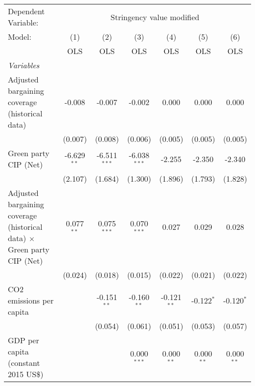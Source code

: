 
\begingroup
\centering
\begin{tabular}{lcccccc}
   \toprule
   Dependent Variable: & \multicolumn{6}{c}{Stringency value modified}\\
   Model:                                                                         & (1)           & (2)            & (3)            & (4)           & (5)          & (6)\\  
                                                                                  &  OLS          & OLS            & OLS            & OLS           & OLS          & OLS\\  
   \midrule
   \emph{Variables}\\
   Adjusted bargaining coverage (historical data)                                 & -0.008        & -0.007         & -0.002         & 0.000         & 0.000        & 0.000\\   
                                                                                  & (0.007)       & (0.008)        & (0.006)        & (0.005)       & (0.005)      & (0.005)\\   
   Green party CIP (Net)                                                          & -6.629$^{**}$ & -6.511$^{***}$ & -6.038$^{***}$ & -2.255        & -2.350       & -2.340\\   
                                                                                  & (2.107)       & (1.684)        & (1.300)        & (1.896)       & (1.793)      & (1.828)\\   
   Adjusted bargaining coverage (historical data) $\times$ Green party CIP (Net)  & 0.077$^{**}$  & 0.075$^{***}$  & 0.070$^{***}$  & 0.027         & 0.029        & 0.028\\   
                                                                                  & (0.024)       & (0.018)        & (0.015)        & (0.022)       & (0.021)      & (0.022)\\   
   CO2 emissions per capita                                                       &               & -0.151$^{**}$  & -0.160$^{**}$  & -0.121$^{**}$ & -0.122$^{*}$ & -0.120$^{*}$\\   
                                                                                  &               & (0.054)        & (0.061)        & (0.051)       & (0.053)      & (0.057)\\   
   GDP per capita (constant 2015 US\$)                                            &               &                & 0.000$^{***}$  & 0.000$^{**}$  & 0.000$^{**}$ & 0.000$^{**}$\\   

\end{tabular}
